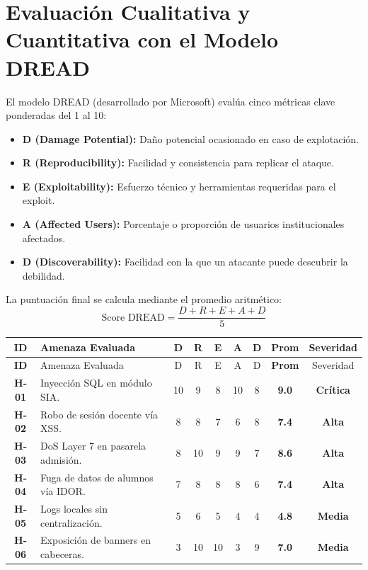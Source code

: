 \section{Evaluación Cualitativa y Cuantitativa con el Modelo DREAD}
El modelo DREAD (desarrollado por Microsoft) evalúa cinco métricas clave ponderadas del 1 al 10:
\begin{itemize}
    \item \textbf{D (Damage Potential):} Daño potencial ocasionado en caso de explotación.
    \item \textbf{R (Reproducibility):} Facilidad y consistencia para replicar el ataque.
    \item \textbf{E (Exploitability):} Esfuerzo técnico y herramientas requeridas para el exploit.
    \item \textbf{A (Affected Users):} Porcentaje o proporción de usuarios institucionales afectados.
    \item \textbf{D (Discoverability):} Facilidad con la que un atacante puede descubrir la debilidad.
\end{itemize}

La puntuación final se calcula mediante el promedio aritmético:
\begin{equation}
    \text{Score DREAD} = \frac{D + R + E + A + D}{5}
\end{equation}

\begin{center}
\small
\begin{longtable}{>{\bfseries}c p{4.2cm} c c c c c >{\bfseries}c c}
\toprule
\rowcolor{outermarginbgcolor}
ID & Amenaza Evaluada & D & R & E & A & D & Prom & Severidad \\
\midrule
\endfirsthead
\toprule
\rowcolor{outermarginbgcolor}
ID & Amenaza Evaluada & D & R & E & A & D & Prom & Severidad \\
\midrule
\endhead
\bottomrule
\endfoot
H-01 & Inyección SQL en módulo SIA. & 10 & 9 & 8 & 10 & 8 & \textbf{9.0} & \textbf{Crítica} \\
\midrule
H-02 & Robo de sesión docente vía XSS. & 8 & 8 & 7 & 6 & 8 & \textbf{7.4} & \textbf{Alta} \\
\midrule
H-03 & DoS Layer 7 en pasarela admisión. & 8 & 10 & 9 & 9 & 7 & \textbf{8.6} & \textbf{Alta} \\
\midrule
H-04 & Fuga de datos de alumnos vía IDOR. & 7 & 8 & 8 & 8 & 6 & \textbf{7.4} & \textbf{Alta} \\
\midrule
H-05 & Logs locales sin centralización. & 5 & 6 & 5 & 4 & 4 & \textbf{4.8} & \textbf{Media} \\
\midrule
H-06 & Exposición de banners en cabeceras. & 3 & 10 & 10 & 3 & 9 & \textbf{7.0} & \textbf{Media} \\
\bottomrule
\end{longtable}
\end{center}

